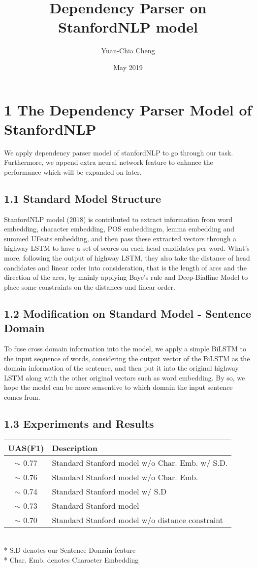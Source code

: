 \documentclass{article}
\title{Dependency Parser on StanfordNLP model}
\author{Yuan-Chia Cheng}
\date{May 2019}
\begin{document}
\maketitle


\section*{1 The Dependency Parser Model of StanfordNLP}
We apply dependency parser model of stanfordNLP to go through our task. Furthermore, we append extra neural network feature to enhance the performance which will be expanded on later.

\subsection*{1.1 Standard Model Structure}
StanfordNLP model (2018) is contributed to extract information from word embedding, character embedding, POS embeddingm, lemma embedding and summed UFeats embedding, and then pass these extracted vectors through a highway LSTM to have a set of scores on each head candidates per word.
What's more, following the output of highway LSTM, they also take the distance of head candidates and linear order into consideration, that is the length of arcs and the direction of the arcs, by mainly applying Baye's rule and Deep-Biaffine Model to place some constraints on the distances and linear order.

\subsection*{1.2 Modification on Standard Model - Sentence Domain}
To fuse cross domain information into the model, we apply a simple BiLSTM to the input sequence of words, considering the output vector of the BiLSTM as the domain information of the sentence, and then put it into the original highway LSTM along with the other original vectors such as word embedding. By so, we hope the model can be more sensentive to which domain the input sentence comes from.


\subsection*{1.3 Experiments and Results}
\begin{tabular}{c l}
\toprule
UAS(F1)& Description\\
\midrule
$\sim$ 0.77& Standard Stanford model w/o Char. Emb. w/ S.D. \\
$\sim$ 0.76& Standard Stanford model w/o Char. Emb.\\
$\sim$ 0.74& Standard Stanford model w/ S.D\\
$\sim$ 0.73& Standard Stanford model\\
$\sim$ 0.70& Standard Stanford model w/o distance constraint\\
\bottomrule
\end{tabular}\\
* S.D denotes our Sentence Domain feature\\
* Char. Emb. denotes Character Embedding
\end{document}
